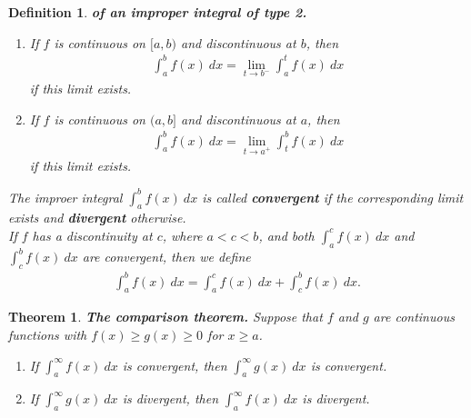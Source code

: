 \documentclass{article}
\theoremstyle{sltheorem}
\newtheorem{definition}{Definition}[section]
\newtheorem{theorem}{Theorem}[section]
\begin{document}
\begin{definition}
    \textbf{of an improper integral of type 2.}
    \begin{enumerate}
        \item If $f$ is continuous on $[a,b)$ and discontinuous at $b$, then
        \begin{align*}
            \int_a^b f(x)\:dx = \lim_{t\to b^-}\int_a^t f(x)\: dx
        \end{align*}
        if this limit exists.
        \item If $f$ is continuous on $(a,b]$ and discontinuous at $a$, then
        \begin{align*}
            \int_a^b f(x)\:dx = \lim_{t\to a^+}\int_t^b f(x)\: dx
        \end{align*}
        if this limit exists.
    \end{enumerate}
    The improer integral $\int_a^b f(x)\:dx$ is called \textbf{convergent} if the corresponding limit exists and \textbf{divergent} otherwise.\\
    If $f$ has a discontinuity at $c$, where $a<c<b$, and both $\int_a^c f(x)\:dx$ and $\int_c^b f(x)\:dx$ are convergent, then we define
    \begin{align*}
        \int_a^b f(x)\: dx = \int_a^c f(x)\:dx + \int_c^b f(x)\:dx.
    \end{align*}
\end{definition}
\begin{theorem}
    \textbf{The comparison theorem.} Suppose that $f$ and $g$ are continuous functions with $f(x)\geq g(x)\geq 0$ for $x\geq a$.
    \begin{enumerate}
        \item If $\int_a^\infty f(x)\:dx$ is convergent, then $\int_a^\infty g(x)\:dx$ is convergent.
        \item If $\int_a^\infty g(x)\:dx$ is divergent, then $\int_a^\infty f(x)\:dx$ is divergent.
    \end{enumerate}
\end{theorem}
\end{document}
